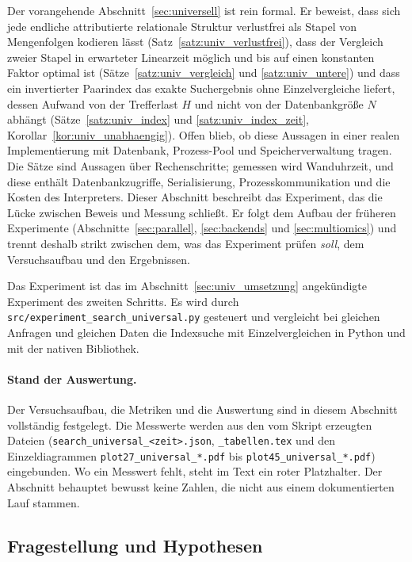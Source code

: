 Der vorangehende Abschnitt~\ref{sec:universell} ist rein formal. Er beweist, dass sich jede endliche attributierte relationale Struktur verlustfrei als Stapel von Mengenfolgen kodieren lässt (Satz~\ref{satz:univ_verlustfrei}), dass der Vergleich zweier Stapel in erwarteter Linearzeit möglich und bis auf einen konstanten Faktor optimal ist (Sätze~\ref{satz:univ_vergleich} und \ref{satz:univ_untere}) und dass ein invertierter Paarindex das exakte Suchergebnis ohne Einzelvergleiche liefert, dessen Aufwand von der Trefferlast $H$ und nicht von der Datenbankgröße $N$ abhängt (Sätze~\ref{satz:univ_index} und \ref{satz:univ_index_zeit}, Korollar~\ref{kor:univ_unabhaengig}). Offen blieb, ob diese Aussagen in einer realen Implementierung mit Datenbank, Prozess-Pool und Speicherverwaltung tragen. Die Sätze sind Aussagen über Rechenschritte; gemessen wird Wanduhrzeit, und diese enthält Datenbankzugriffe, Serialisierung, Prozesskommunikation und die Kosten des Interpreters. Dieser Abschnitt beschreibt das Experiment, das die Lücke zwischen Beweis und Messung schließt. Er folgt dem Aufbau der früheren Experimente (Abschnitte~\ref{sec:parallel}, \ref{sec:backends} und \ref{sec:multiomics}) und trennt deshalb strikt zwischen dem, was das Experiment prüfen \emph{soll}, dem Versuchsaufbau und den Ergebnissen.

Das Experiment ist das im Abschnitt~\ref{sec:univ_umsetzung} angekündigte Experiment des zweiten Schritts. Es wird durch \texttt{src/experiment\_search\_universal.py} gesteuert und vergleicht bei gleichen Anfragen und gleichen Daten die Indexsuche mit Einzelvergleichen in Python und mit der nativen Bibliothek.

\paragraph{Stand der Auswertung.} Der Versuchsaufbau, die Metriken und die Auswertung sind in diesem Abschnitt vollständig festgelegt. Die Messwerte werden aus den vom Skript erzeugten Dateien (\texttt{search\_universal\_<zeit>.json}, \texttt{\_tabellen.tex} und den Einzeldiagrammen \texttt{plot27\_universal\_*.pdf} bis \texttt{plot45\_universal\_*.pdf}) eingebunden. Wo ein Messwert fehlt, steht im Text ein roter Platzhalter. Der Abschnitt behauptet bewusst keine Zahlen, die nicht aus einem dokumentierten Lauf stammen.

\subsection{Fragestellung und Hypothesen}
\label{sec:ucx_hypothesen}

